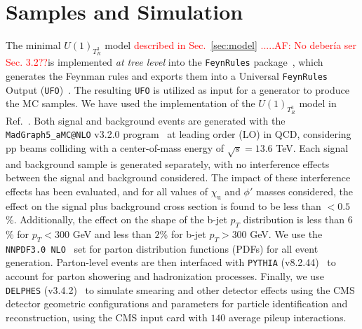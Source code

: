 
\section{Samples and Simulation}\label{sec:sims}


The minimal $U(1)_{T^3_R}$ model \textcolor{red}{described in Sec.~\ref{sec:model} .....AF: No debería ser Sec. 3.2??}is implemented \textit{at tree level} into the \texttt{FeynRules} package~\parencite{Alloul:2013bka}, which generates the Feynman rules and exports them into a Universal \texttt{FeynRules} Output (\texttt{UFO})~\parencite{Degrande:2011ua}. The resulting \texttt{UFO} is utilized as input for a generator to produce the MC samples. We have used the implementation of the $U(1)_{T^3_R}$ model in Ref.~\parencite{Dutta2023}. Both signal and background events are generated with the \texttt{MadGraph5\_aMC@NLO} v3.2.0 program~\parencite{Alwall:2014hca,Alwall:2014bza} at leading order (LO) in QCD, considering \textrm{pp} beams colliding with a center-of-mass energy of $\sqrt{s} = 13.6$ \textrm{TeV}. Each signal and background sample is generated separately, with no interference effects between the signal and background considered. The impact of these interference effects has been evaluated, and for all values of $\chi_\mathrm{u}$ and $\phi'$ masses considered, the effect on the signal plus background cross section is found to be less than $<0.5$\%. Additionally, the effect on the shape of the b-jet $p_{T}$ distribution is less than $6$\% for $p_{T} < 300$ GeV and less than $2$\% for \textrm{b}-jet $p_{T} > 300$ GeV. We use the \texttt{NNPDF3.0~NLO}~\parencite{NNPDF:2014otw} set for parton distribution functions (PDFs) for all event generation. Parton-level events are then interfaced with \texttt{PYTHIA} (v8.2.44)~\parencite{Sjostrand:2014zea} to account for parton showering and hadronization processes. Finally, we use  \texttt{DELPHES} (v3.4.2)~\parencite{deFavereau:2013fsa} to simulate smearing and other detector effects using the CMS detector geometric configurations and parameters for particle identification and reconstruction, using the CMS input card with $140$ average pileup interactions.



